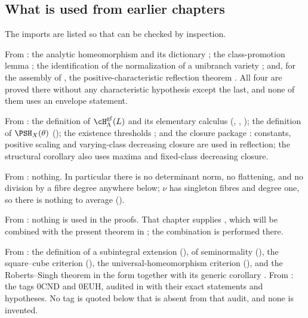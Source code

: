 \subsection{What is used from earlier chapters}
\label{sec:ch44-dependencies}

The imports are listed so that  can be checked by
inspection.

From : the analytic homeomorphism
 and its dictionary
; the class-promotion lemma
; the identification of the
normalization of a unibranch variety
; and, for the assembly of
, the
positive-characteristic reflection theorem
.  All four are proved there
without any characteristic hypothesis except the last, and none of them uses
an envelope statement.

From : the definition of
$\cH^{\mathrm{gf}}_\Lambda(L)$ and its elementary calculus
(, ,
); the definition of $\PSH_X(\theta)$
(); the existence thresholds
; and the closure package
: constants, positive scaling and varying-class
decreasing closure are used in reflection; the structural corollary also
uses maxima and fixed-class decreasing closure.

From : nothing.  In particular there is no
determinant norm, no flattening, and no division by a fibre degree anywhere
below; $\nu$ has singleton fibres and degree one, so there is nothing to
average ().

From : nothing is used in the proofs.  That
chapter supplies , which will be combined with
the present theorem in ; the combination
is performed there.

From : the definition of a subintegral extension
(), of seminormality
(), the square--cube criterion
(), the universal-homeomorphism criterion
(), and the Roberts--Singh
theorem in the form  together with its generic
corollary .  From : the tags
0CND and 0EUH, audited in  with
their exact statements and hypotheses.  No tag is quoted below that is
absent from that audit, and none is invented.

